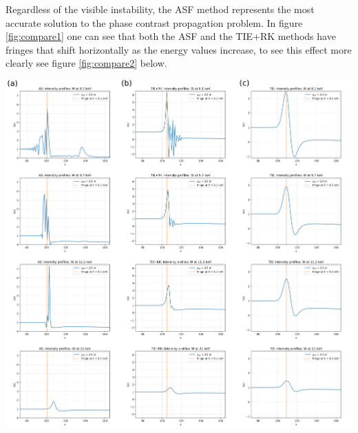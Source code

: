 \documentclass[10pt, a4paper, singlespacing]{report}
\newenvironment{Figure}
    {\par\medskip\noindent\minipage{\linewidth}}
    {\endminipage\par\medskip}
\begin{document}
Regardless of the visible instability, the ASF method represents the most accurate solution to the phase contrast propagation problem. In figure \ref{fig:compare1} one can see that both the ASF and the TIE+RK methods have fringes that shift horizontally as the energy values increase, to see this effect more clearly see figure \ref{fig:compare2} below.
\begin{Figure}\label{fig:compare2}  
 \centering
  \hspace*{-0.9cm}
 \includegraphics[width=1.1\linewidth]{AS_vs_TIE+RK_vs_TIE_2.pdf}

\end{Figure}
\end{document}
